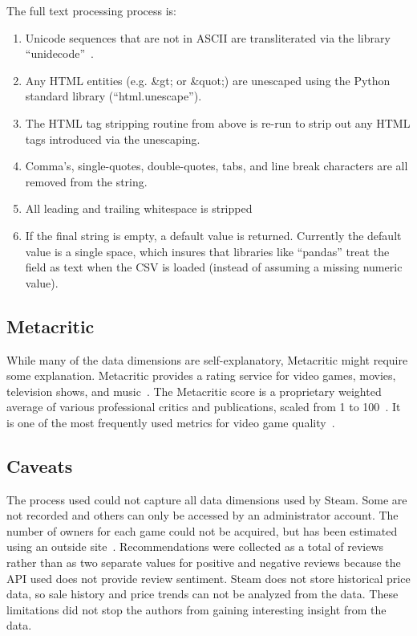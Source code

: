 \documentclass[10pt,journal,compsoc]{IEEEtran}
\begin{document}
The full text processing process is:

\begin{enumerate}
    \item Unicode sequences that are not in ASCII are transliterated via the
    library ``unidecode''~\cite{unidecode}.

    \item Any HTML entities (e.g. \&gt; or \&quot;) are unescaped using the Python
    standard library (``html.unescape'').

    \item The HTML tag stripping routine from above is re-run to strip out any
    HTML tags introduced via the unescaping.

    \item Comma's, single-quotes, double-quotes, tabs, and line break characters are
    all removed from the string.

    \item All leading and trailing whitespace is stripped

    \item If the final string is empty, a default value is returned. Currently the
    default value is a single space, which insures that libraries like ``pandas''
    treat the field as text when the CSV is loaded (instead of assuming a missing
    numeric value).
\end{enumerate}


\subsection{Metacritic}

While many of the data dimensions are self-explanatory, Metacritic might
require some explanation. Metacritic provides a rating service for video
games, movies, television shows, and music~\cite{metacritic}. The Metacritic
score is a proprietary weighted average of various professional critics and
publications, scaled from 1 to 100~\cite{metacritic-score}. It is one of the
most frequently used metrics for video game quality~\cite{metacritic-vgdominant}.


\subsection{Caveats}

The process used could not capture all data dimensions used by Steam. Some are
not recorded and others can only be accessed by an administrator account. The
number of owners for each game could not be acquired, but has been estimated
using an outside site~\cite{steamspy}. Recommendations were collected as a
total of reviews rather than as two separate values for positive and negative
reviews because the API used does not provide review sentiment. Steam does not
store historical price data, so sale history and price trends can not be
analyzed from the data. These limitations did not stop the authors from
gaining interesting insight from the data.
\end{document}
